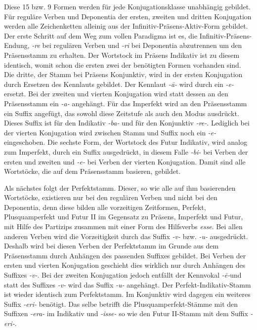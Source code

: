 Diese 15 bzw. 9 Formen werden für jede Konjugationsklasse unabhängig gebildet. Für reguläre Verben und Deponentia der ersten, zweiten und dritten Konjugation werden alle Zeichenketten alleinig aus der Infinitiv-Präsens-Aktiv-Form gebildet. Der erste Schritt auf dem Weg zum vollen Paradigma ist es, die Infinitiv-Präsens-Endung, \textit{-re} bei regulären Verben und \textit{-ri} bei Deponentia abzutrennen um den Präsensstamm zu erhalten. Der Wortstock im Präsens Indikativ ist zu diesem identisch, womit schon die ersten zwei der benötigten Formen vorhanden sind. Die dritte, der Stamm bei Präsens Konjunktiv, wird in der ersten Konjugation durch Ersetzen des Kennlauts gebildet. Der Kennlaut \textit{-ā-} wird durch ein \textit{-e-} ersetzt. Bei der zweiten und vierten Konjugation wird statt dessen an den Präsensstamm ein \textit{-a-} angehängt. Für das Imperfekt wird an den Präsensstamm ein Suffix angefügt, das sowohl diese Zeitstufe als auch den Modus ausdrückt. Dieses Suffix ist für den Indikativ \textit{-ba-} und für den Konjunktiv \textit{-re-}. Lediglich bei der vierten Konjugation wird zwischen Stamm und Suffix noch ein \textit{-e-} eingeschoben. Die sechste Form, der Wortstock des Futur Indikativ, wird analog zum Imperfekt, durch ein Suffix ausgedrückt, in diesem Falle \textit{-bi-} bei Verben der ersten und zweiten und \textit{-e-} bei Verben der vierten Konjugation. Damit sind alle Wortstöcke, die auf dem Präsensstamm basieren, gebildet. \par
Als nächstes folgt der Perfektstamm. Dieser, so wie alle auf ihm basierenden Wortstöcke, existieren nur bei den regulären Verben und nicht bei den Deponentia, denn diese bilden alle vorzeitigen Zeitformen, Perfekt, Plusquamperfekt und Futur II im Gegensatz zu Präsens, Imperfekt und Futur, mit Hilfe des Partizips zusammen mit einer Form des Hilfsverbs \textit{esse}. Bei allen anderen Verben wird die Vorzeitigkeit durch das Suffix \textit{-v-} bzw. \textit{-u-} ausgedrückt. Deshalb wird bei diesen Verben der Perfektstamm im Grunde aus dem Präsensstamm durch Anhängen des passenden Suffixes gebildet. Bei Verben der ersten und vierten Konjugation geschieht dies wirklich nur durch Anhängen des Suffixes \textit{-v-}. Bei der zweiten Konjugation jedoch entfällt der Kennvokal \textit{-ē-}und statt des Suffixes \textit{-v-} wird das Suffix \textit{-u-} angehängt. Der Perfekt-Indikativ-Stamm ist wieder identisch zum Perfektstamm. Im Konjunktiv wird dagegen ein weiteres Suffix \textit{-eri-} benötigt. Das selbe betrifft die Plusquamperfekt-Stämme mit den Suffixen \textit{-era-} im Indikativ und \textit{-isse-} so wie den Futur II-Stamm mit dem Suffix \textit{-eri-}. \par
